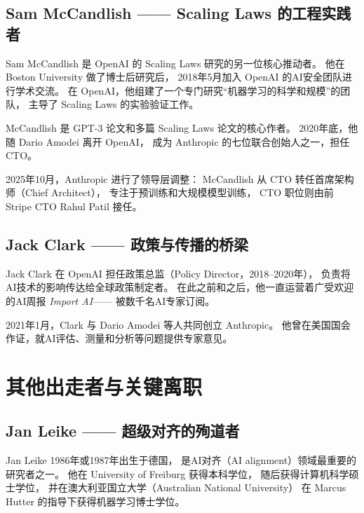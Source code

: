 \subsection{Sam McCandlish —— Scaling Laws 的工程实践者}
\label{subsec:sam-mccandlish}

Sam McCandlish 是 OpenAI 的 Scaling Laws 研究的另一位核心推动者。
他在 Boston University 做了博士后研究后，
2018年5月加入 OpenAI 的AI安全团队进行学术交流。
在 OpenAI，他组建了一个专门研究``机器学习的科学和规模''的团队，
主导了 Scaling Laws 的实验验证工作。

McCandlish 是 GPT-3 论文和多篇 Scaling Laws 论文的核心作者。
2020年底，他随 Dario Amodei 离开 OpenAI，
成为 Anthropic 的七位联合创始人之一，担任 CTO。

2025年10月，Anthropic 进行了领导层调整：
McCandlish 从 CTO 转任首席架构师（Chief Architect），
专注于预训练和大规模模型训练，
CTO 职位则由前 Stripe CTO Rahul Patil 接任。


\subsection{Jack Clark —— 政策与传播的桥梁}
\label{subsec:jack-clark}

Jack Clark 在 OpenAI 担任政策总监（Policy Director，2018--2020年），
负责将AI技术的影响传达给全球政策制定者。
在此之前和之后，他一直运营着广受欢迎的AI周报 \emph{Import AI}——
被数千名AI专家订阅。

2021年1月，Clark 与 Dario Amodei 等人共同创立 Anthropic。
他曾在美国国会作证，就AI评估、测量和分析等问题提供专家意见。


\section{其他出走者与关键离职}
\label{sec:openai-other-departures}

\subsection{Jan Leike —— 超级对齐的殉道者}
\label{subsec:jan-leike}

Jan Leike 1986年或1987年出生于德国，
是AI对齐（AI alignment）领域最重要的研究者之一。
他在 University of Freiburg 获得本科学位，
随后获得计算机科学硕士学位，
并在澳大利亚国立大学（Australian National University）
在 Marcus Hutter 的指导下获得机器学习博士学位。

